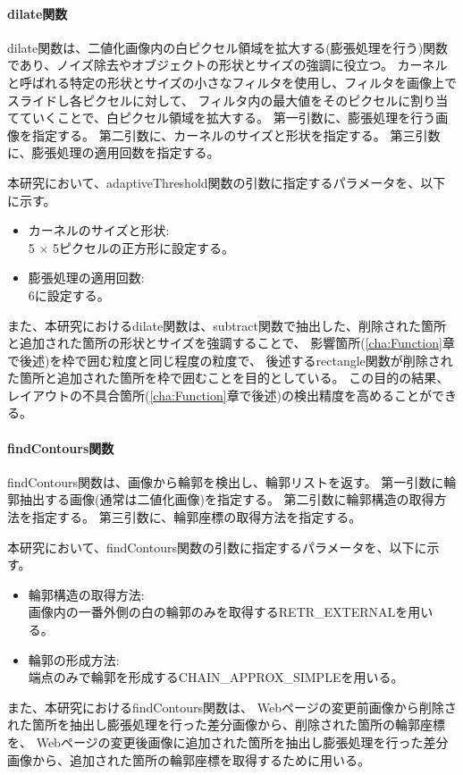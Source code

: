 \paragraph{dilate関数}
dilate関数は、二値化画像内の白ピクセル領域を拡大する(膨張処理を行う)関数であり、ノイズ除去やオブジェクトの形状とサイズの強調に役立つ。
カーネルと呼ばれる特定の形状とサイズの小さなフィルタを使用し、フィルタを画像上でスライドし各ピクセルに対して、
フィルタ内の最大値をそのピクセルに割り当てていくことで、白ピクセル領域を拡大する。
第一引数に、膨張処理を行う画像を指定する。
第二引数に、カーネルのサイズと形状を指定する。
第三引数に、膨張処理の適用回数を指定する。
\par
本研究において、adaptiveThreshold関数の引数に指定するパラメータを、以下に示す。
\begin{itemize}
    \setlength{\itemsep}{0pt}
          \setlength{\parsep}{0pt}
    \item カーネルのサイズと形状:\\
          5 $\times$ 5ピクセルの正方形に設定する。
    \item 膨張処理の適用回数:\\
          $6$に設定する。
\end{itemize}
\par
また、本研究におけるdilate関数は、subtract関数で抽出した、削除された箇所と追加された箇所の形状とサイズを強調することで、
影響箇所(\ref{cha:Function}章で後述)を枠で囲む粒度と同じ程度の粒度で、
後述するrectangle関数が削除された箇所と追加された箇所を枠で囲むことを目的としている。
この目的の結果、レイアウトの不具合箇所(\ref{cha:Function}章で後述)の検出精度を高めることができる。
\paragraph{findContours関数}
findContours関数は、画像から輪郭を検出し、輪郭リストを返す。
第一引数に輪郭抽出する画像(通常は二値化画像)を指定する。
第二引数に輪郭構造の取得方法を指定する。
第三引数に、輪郭座標の取得方法を指定する。
\par
本研究において、findContours関数の引数に指定するパラメータを、以下に示す。
\begin{itemize}
    \setlength{\itemsep}{0pt}
          \setlength{\parsep}{0pt}
    \item 輪郭構造の取得方法:\\
          画像内の一番外側の白の輪郭のみを取得するRETR\_EXTERNALを用いる。
    \item 輪郭の形成方法:\\
          端点のみで輪郭を形成するCHAIN\_APPROX\_SIMPLEを用いる。
\end{itemize}
\par
また、本研究におけるfindContours関数は、
Webページの変更前画像から削除された箇所を抽出し膨張処理を行った差分画像から、削除された箇所の輪郭座標を、
Webページの変更後画像に追加された箇所を抽出し膨張処理を行った差分画像から、追加された箇所の輪郭座標を取得するために用いる。
